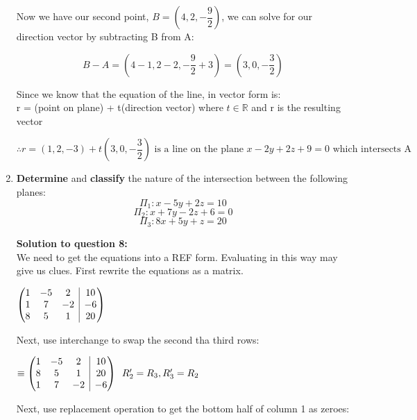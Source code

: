 \documentclass[12pt]{book}
\makeatletter
\newenvironment{amatrix}[1]{%
  \left(\begin{array}{@{}*{#1}{c}|c@{}}
}{%
  \end{array}\right)
}
\makeatother
\begin{document}
\begin{enumerate}
\vspace{-1cm}
Now we have our second point, $B = \left( 4, 2, -\dfrac{9}{2} \right)$, we can solve for our direction vector by subtracting B from A:

$$B-A = \left( 4-1, 2-2, -\dfrac{9}{2}+3 \right) = \left( 3, 0, -\dfrac{3}{2} \right)$$

Since we know that the equation of the line, in vector form is: \\
r = (point on plane) + t(direction vector) where $t \in \mathbb{R}$  and r is the resulting vector

\vspace{0.5cm}
\begin{center}
  $\boxed{\therefore r = (1, 2, -3) + t\left(3, 0, -\dfrac{3}{2} \right) \text{ is a line on the plane } x-2y+2z+9=0 \text{ which intersects A}}$
\end{center}

\vspace{0.3cm}

\newpage

\item \textbf{Determine} and \textbf{classify} the nature of the intersection between the following planes:
$$\Pi_1: x-5y+2z=10 $$
$$\Pi_2: x+7y-2z+6=0 $$
$$\Pi_3: 8x+5y+z=20 $$

\vspace{0.3cm} 
\textbf{Solution to question 8:}\\
 We need to get the equations into a REF form. 
 Evaluating in this way may give us clues. First rewrite the equations 
 as a matrix.
\vspace{0.4cm}

$
\begin{amatrix}{3}
   1 & -5 & 2 & 10\\  1 & 7 & -2  & -6\\ 8 & 5 & 1 & 20 
 \end{amatrix}
$

\vspace{0.4cm}
Next, use interchange to swap the second tha third rows:
\vspace{0.4cm}

$
\equiv
\begin{amatrix}{3}
   1 & -5 & 2 & 10\\  8 & 5 & 1 & 20\\ 1 & 7 & -2  & -6
 \end{amatrix}
 \text{\space \space } R'_2 = R_3, R'_3 = R_2
$

\vspace{0.4cm}
Next, use replacement operation to get the bottom half of column 1 as zeroes:
\vspace{0.4cm}


\end{enumerate}
\end{document}
